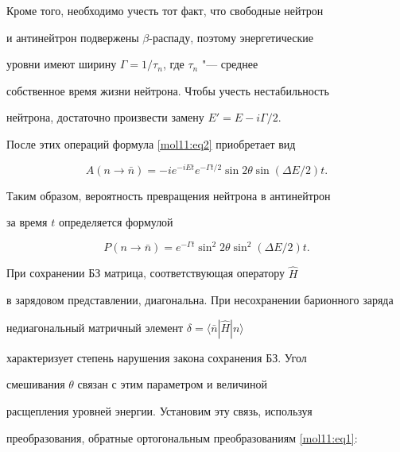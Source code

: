  Кроме того, необходимо учесть тот факт, что свободные нейтрон

 и антинейтрон  подвержены $\beta$-распаду, поэтому энергетические

 уровни имеют ширину $\Gamma = 1/\tau_n$,  где $\tau_n$ "--- среднее

 собственное время жизни нейтрона. Чтобы учесть нестабильность

нейтрона, достаточно произвести замену $E' = E - i \Gamma/2$.

После  этих  операций формула \eqref{mol11:eq2} приобретает вид

\begin{equation}

 \label{mol11:eq3}

  A(n \to \bar  n) = - i e^{- i E t} e^{- \Gamma t /2}  \sin{2 \theta}

   \sin (\Delta E /2)t.

  \end{equation}



 Таким образом, вероятность превращения нейтрона в антинейтрон

 за время $t$ определяется формулой

  \begin{equation}

   \label{mol11:eq4}

 P(n \to \bar  n) = e^{-\Gamma t} \sin^2  2{\theta} \sin^2 (\Delta E /2) t.

 \end{equation}

 \smallskip




 При сохранении БЗ матрица, соответствующая оператору $\hat H$

 в зарядовом представлении, диагональна. При несохранении барионного заряда

 недиагональный матричный элемент \mbox{$\delta = \langle \bar  n|\hat H|n \rangle$}

 характеризует степень нарушения закона сохранения БЗ. Угол

 смешивания $\theta$ связан с этим параметром и величиной

 расщепления уровней энергии. Установим эту связь, используя

 преобразования, обратные ортогональным преобразованиям \eqref{mol11:eq1}:

